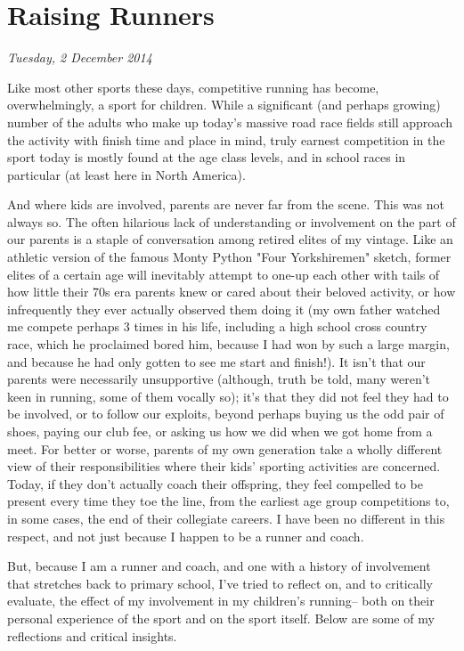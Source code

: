\chapter{Raising Runners}
\textit{Tuesday, 2 December 2014}
\bigskip

Like most other sports these days, competitive running has become, overwhelmingly, a sport for children. While a significant (and perhaps growing) number of the adults who make up today's massive road race fields still approach the activity with finish time and place in mind, truly earnest competition in the sport today is mostly found at the age class levels, and in school races in particular (at least here in North America).

And where kids are involved, parents are never far from the scene. This was not always so. The often hilarious lack of understanding or involvement on the part of our parents is a staple of conversation among retired elites of my vintage. Like an athletic version of the famous Monty Python "Four Yorkshiremen" sketch, former elites of a certain age will inevitably attempt to one-up each other with tails of how little their 70s era parents knew or cared about their beloved activity, or how infrequently they ever actually observed them doing it (my own father watched me compete perhaps 3 times in his life, including a high school cross country race, which he proclaimed bored him, because I had won by such a large margin, and because he had only gotten to see me start and finish!). It isn't that our parents were necessarily unsupportive (although, truth be told, many weren't keen in running, some of them vocally so); it's that they did not feel they had to be involved, or to follow our exploits, beyond perhaps buying us the odd pair of shoes, paying our club fee, or asking us how we did when we got home from a meet. For better or worse, parents of my own generation take a wholly different view of their responsibilities where their kids' sporting activities are concerned. Today, if they don't actually coach their offspring, they feel compelled to be present every time they toe the line, from the earliest age group competitions to, in some cases, the end of their collegiate careers. I have been no different in this respect, and not just because I happen to be a runner and coach.

But, because I am a runner and coach, and one with a history of involvement that stretches back to primary school, I've tried to reflect on, and to critically evaluate, the effect of my involvement in my children's running-- both on their personal experience of the sport and on the sport itself. Below are some of my reflections and critical insights.

